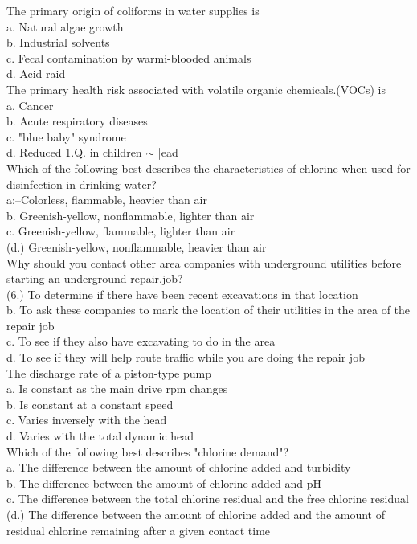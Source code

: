 The primary origin of coliforms in water supplies is\\
a. Natural algae growth\\
b. Industrial solvents\\
c. Fecal contamination by warmi-blooded animals\\
d. Acid raid\\

The primary health risk associated with volatile organic chemicals.(VOCs) is\\
a. Cancer\\
b. Acute respiratory diseases\\
c. "blue baby" syndrome\\
d. Reduced 1.Q. in children $\sim$ |ead\\

Which of the following best describes the characteristics of chlorine when used for disinfection in drinking water?\\
a:--Colorless, flammable, heavier than air\\
b. Greenish-yellow, nonflammable, lighter than air\\
c. Greenish-yellow, flammable, lighter than air\\
(d.) Greenish-yellow, nonflammable, heavier than air\\

Why should you contact other area companies with underground utilities before starting an underground repair.job?\\
(6.) To determine if there have been recent excavations in that location\\
b.  To ask these companies to mark the location of their utilities in the area of the repair job\\
c. To see if they also have excavating to do in the area\\
d. To see if they will help route traffic while you are doing the repair job\\

The discharge rate of a piston-type pump\\
a. Is constant as the main drive rpm changes\\
b. Is constant at a constant speed\\
c. Varies inversely with the head\\
d. Varies with the total dynamic head\\

Which of the following best describes "chlorine demand"?\\
a. The difference between the amount of chłorine added and turbidity\\
b. The difference between the amount of chlorine added and $\mathrm{pH}$\\
c. The difference between the total chlorine residual and the free chlorine residual\\
(d.) The difference between the amount of chlorine added and the amount of residual chlorine remaining after a given contact time\\

